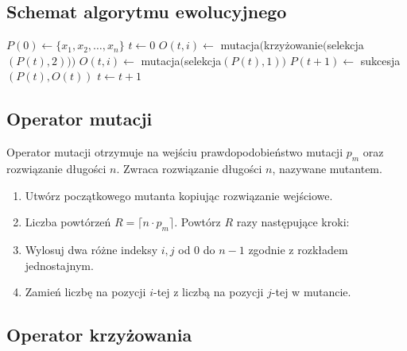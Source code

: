 \documentclass[12pt, a4paper]{article}
\begin{document}
\subsection{Schemat algorytmu ewolucyjnego}

\begin{algorithm}[!htb]
\label{ea}
\begin{algorithmic}[1]
	\State $P(0) \gets \{x_1, x_2, \ldots, x_n\}$
	\State $t \gets 0$
    			\State $O(t,i) \gets$ mutacja$($krzy{\.z}owanie$($selekcja$(P(t), 2)))$
    		\Else
    			\State $O(t,i) \gets$ mutacja$($selekcja$(P(t),1))$
    		\EndIf
    	\EndFor
    \State $P(t+1) \gets$ sukcesja$(P(t),O(t))$
    \State $t \gets t+1$
  	\EndWhile
\EndFunction
\end{algorithmic}
\end{algorithm}

\subsection{Operator mutacji}

Operator mutacji otrzymuje na wejściu prawdopodobieństwo mutacji $p_m$ oraz rozwiązanie długości $n$.
Zwraca rozwiązanie długości $n$, nazywane mutantem.

\begin{enumerate}
 \item Utwórz początkowego mutanta kopiując rozwiązanie wejściowe.
 \item Liczba powtórzeń $R = \lceil n \cdot  p_m \rceil$. Powtórz $R$ razy następujące kroki:
 \item Wylosuj dwa różne indeksy $i, j$ od 0 do $n-1$ zgodnie z rozkładem jednostajnym.
 \item Zamień liczbę na pozycji $i$-tej z liczbą na pozycji $j$-tej w mutancie.
\end{enumerate}

\subsection{Operator krzyżowania}
\end{document}
